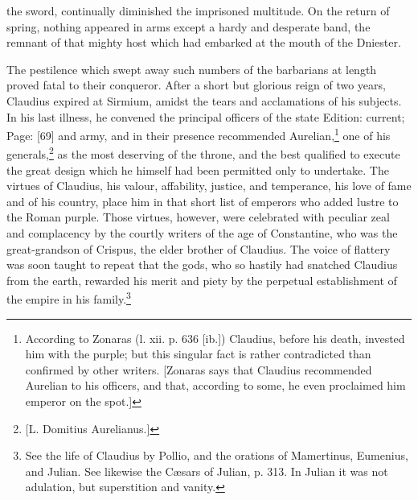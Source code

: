 the sword, continually diminished the imprisoned multitude. On the return of spring, nothing appeared in arms except a hardy and desperate band, the remnant of that mighty host which had embarked at the mouth of the Dniester.

The pestilence which swept away such numbers of the barbarians at length proved fatal to their conqueror. After a short but glorious reign of two years, Claudius expired at Sirmium, amidst the tears and acclamations of his subjects. In his last illness, he convened the principal officers of the state Edition: current; Page: [69] and army, and in their presence recommended Aurelian,\footnote{According to Zonaras (l. xii. p. 636 [ib.]) Claudius, before his death, invested him with the purple; but this singular fact is rather contradicted than confirmed by other writers. [Zonaras says that Claudius recommended Aurelian to his officers, and that, according to some, he even proclaimed him emperor on the spot.]} one of his generals,\footnote{[L. Domitius Aurelianus.]} as the most deserving of the throne, and the best qualified to execute the great design which he himself had been permitted only to undertake. The virtues of Claudius, his valour, affability, justice, and temperance, his love of fame and of his country, place him in that short list of emperors who added lustre to the Roman purple. Those virtues, however, were celebrated with peculiar zeal and complacency by the courtly writers of the age of Constantine, who was the great-grandson of Crispus, the elder brother of Claudius. The voice of flattery was soon taught to repeat that the gods, who so hastily had snatched Claudius from the earth, rewarded his merit and piety by the perpetual establishment of the empire in his family.\footnote{See the life of Claudius by Pollio, and the orations of Mamertinus, Eumenius, and Julian. See likewise the Cæsars of Julian, p. 313. In Julian it was not adulation, but superstition and vanity.}

